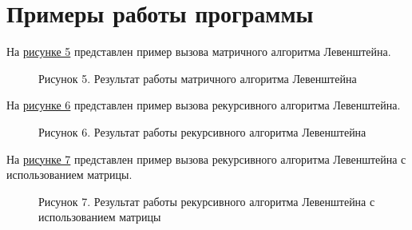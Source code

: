 \documentclass[12pt]{report}
\begin{document}
	\section{Примеры работы программы}
	На \hyperref[picture_5]{рисунке 5} представлен пример вызова матричного алгоритма Левенштейна.
	\begin{figure}[h!]\label{picture_5}
		\caption*{Рисунок 5. Результат работы матричного алгоритма Левенштейна}
	\end{figure}
	\newpage
	\par На \hyperref[picture_6]{рисунке 6} представлен пример вызова рекурсивного алгоритма Левенштейна.
	\begin{figure}[h!]\label{picture_6}
		\caption*{Рисунок 6. Результат работы рекурсивного алгоритма Левенштейна}
	\end{figure}
	\par На \hyperref[picture_7]{рисунке 7} представлен пример вызова рекурсивного алгоритма Левенштейна с использованием матрицы.
	\begin{figure}[h!]\label{picture_7}
		\caption*{Рисунок 7. Результат работы рекурсивного алгоритма Левенштейна с использованием матрицы}
	\end{figure}
\end{document}
